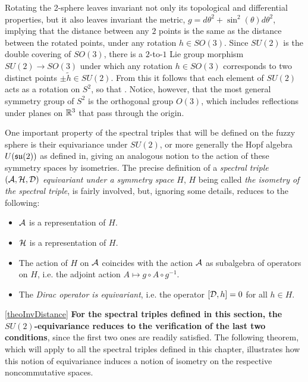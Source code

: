 Rotating the 2-sphere leaves invariant not only its topological and differential properties, but it also leaves invariant the metric, $g = d\theta^2 + \sin^2(\theta) d\theta^2$, implying that the distance between any $2$ points is the same as the distance between the rotated points, under any rotation $h \in SO(3)$. Since $SU(2)$ is the double covering of $SO(3)$, there is a $2$-to-$1$ Lie group morphism $SU(2) \to SO(3)$ under which any rotation $h \in SO(3)$ corresponds to two distinct points $\pm \tilde h \in SU(2)$. From this it follows that each element of $SU(2)$ acts as a rotation on $S^2$, so that . Notice, however, that the most general symmetry group of $S^2$ is the orthogonal group $O(3)$, which includes reflections under planes on $\mathbb{R}^3$ that pass through the origin.

One important property of the spectral triples that will be defined on the fuzzy sphere is their equivariance under $SU(2)$, or more generally the Hopf algebra $U(\mathfrak{su}(2))$ as defined in\cite{Sitarz}, giving an analogous notion to the action of these symmetry spaces by isometries. The precise definition of a \textit{spectral triple $(\mathcal A, \mathcal H, \mathcal D)$ equivariant under a symmetry space $H$}, $H$ being called \textit{the isometry of the spectral triple}, is fairly involved, but, ignoring some details, reduces to the following:
    \begin{itemize}
    
    \item $\mathcal A$ is a representation of $H$.
    
    \item $\mathcal H $ is a representation of $H$.
    
    \item The action of $H$ on $\mathcal A$ coincides with the action $\mathcal A$ as subalgebra of operators on $H$, i.e. the adjoint action $A \mapsto g \circ A \circ g^{-1}$. %
    
    \item The \textit{Dirac operator is equivariant}, i.e. the operator $[\mathcal D, h] = 0$ for all $h \in H$.
    
    \end{itemize}
\ref{theoInvDistance}
\textbf{For the spectral triples defined in this section, the $SU(2)$-equivariance reduces to the verification of the last two conditions}, since the first two ones are readily satisfied. The following theorem, which will apply to all the spectral triples defined in this chapter, illustrates how this notion of equivariance induces a notion of isometry on the respective noncommutative spaces.


